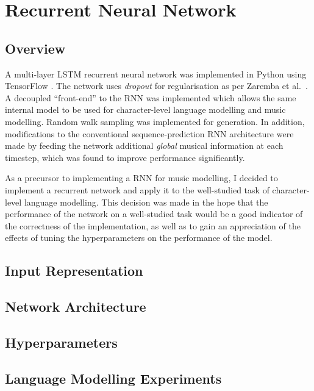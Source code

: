 \documentclass[12pt,a4paper,twoside,openright]{report}
\begin{document}
\section{Recurrent Neural Network}

\subsection{Overview}

A multi-layer LSTM recurrent neural network was implemented in Python using
TensorFlow \cite{abadi2016tensorflow}. The network uses \emph{dropout} for
regularisation as per Zaremba et al.\ \cite{zaremba2014recurrent}. A decoupled
``front-end'' to the RNN was implemented which allows the same internal model to
be used for character-level language modelling and music modelling. Random walk
sampling was implemented for generation. In addition, modifications to the
conventional sequence-prediction RNN architecture were made by feeding the
network additional \emph{global} musical information at each timestep, which was
found to improve performance significantly.

As a precursor to implementing a RNN for music modelling, I decided to implement
a recurrent network and apply it to the well-studied task of character-level
language modelling. This decision was made in the hope that the performance of
the network on a well-studied task would be a good indicator of the correctness
of the implementation, as well as to gain an appreciation of the effects of
tuning the hyperparameters on the performance of the model.

\subsection{Input Representation}

\subsection{Network Architecture}

\subsection{Hyperparameters}

\subsection{Language Modelling Experiments}
\end{document}
